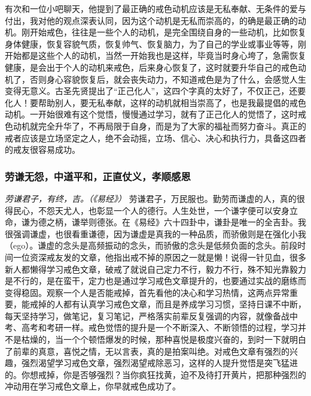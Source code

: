 有次和一位小吧聊天，他提到了最正确的戒色动机应该是无私奉献、无条件的爱与付出，我对他的观点深表认同，因为这个动机是无私而崇高的，的确是最正确的动机。刚开始戒色，往往是一些个人的动机，是完全围绕自身的一些动机，比如恢复身体健康，恢复容貌气质，恢复帅气、恢复脑力，为了自己的学业或事业等等，刚开始都是这些个人的动机，当然一开始我也是这样，毕竟当时身心垮了，急需恢复健康，是会出于个人的动机来戒色，后来身心恢复了，这时就要升华自己的戒色动机了，否则身心容貌恢复后，就会丧失动力，不知道戒色是为了什么，会感觉人生变得无意义。古圣先贤提出了“正己化人”，这四个字真的太好了，不仅正己，还要化人！要帮助别人，要无私奉献，这样的动机就相当崇高了，也是我最提倡的戒色动机。一开始很难有这个觉悟，慢慢通过学习，就有了正己化人的觉悟了，这时戒色动机就完全升华了，不再局限于自身，而是为了大家的福祉而努力奋斗。真正的戒者应该是立场坚定之人，绝不会动摇，立场、信心、决心和执行力，具备这四者的戒友很容易成功。

\subsubsection{劳谦无怨，中道平和，正直仗义，孝顺感恩}

\textit{劳谦君子，有终，吉。（《易经》）} 劳谦君子，万民服也。勤劳而谦虚的人，真的很得民心，不怨天尤人，也彰显一个人的德行。人生处世，一个谦字便可以安身立命，谦为德之柄，谦举则德张。在《易经》六十四卦中，谦卦是唯一的全吉卦。我很强调谦虚，也很看重谦德，因为谦虚是真我的一种品质，而骄傲则是在强化小我（ego）。谦虚的念头是高频振动的念头，而骄傲的念头是低频负面的念头。前段时间一位资深戒友发的文章，他指出戒不掉的原因之一就是懒！说得一针见血，很多新人都懒得学习戒色文章，破戒了就说自己定力不行，毅力不行，殊不知光靠毅力是不行的，是在蛮干，定力也是通过学习戒色文章提升的，也要通过实战的磨练而变得稳固。观察一个人是否能戒掉，首先看他的决心和学习热情，这两点异常重要，能戒掉的人都有认真学习戒色文章，而且是养成学习习惯，坚持日课不中断，每天坚持学习，做笔记，复习笔记，严格落实前辈反复强调的内容，就像备战中考、高考和考研一样。戒色觉悟的提升是一个不断深入、不断领悟的过程，学习并不是枯燥的，当一个个顿悟爆发的时候，那种喜悦是极度兴奋的，到时一下就明白了前辈的真意，喜悦之情，无以言表，真的是拍案叫绝。对戒色文章有强烈的兴趣，强烈渴望学习戒色文章，强烈渴望戒除恶习，这样的人提升觉悟是突飞猛进的。你想戒掉，你是否够强烈？当你疯狂找黄，迫不及待打开黄片，把那种强烈的冲动用在学习戒色文章上，你早就戒色成功了。

